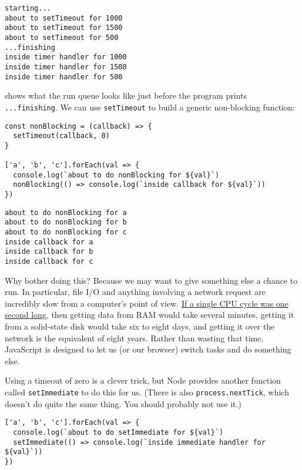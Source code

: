 \begin{verbatim}
starting...
about to setTimeout for 1000
about to setTimeout for 1500
about to setTimeout for 500
...finishing
inside timer handler for 1000
inside timer handler for 1500
inside timer handler for 500
\end{verbatim}


 shows what the run queue looks like just before the program prints \texttt{...finishing}.
We can use \texttt{setTimeout} to build a generic non-blocking function:

\begin{verbatim}
const nonBlocking = (callback) => {
  setTimeout(callback, 0)
}

['a', 'b', 'c'].forEach(val => {
  console.log(`about to do nonBlocking for ${val}`)
  nonBlocking(() => console.log(`inside callback for ${val}`))
})
\end{verbatim}

\begin{verbatim}
about to do nonBlocking for a
about to do nonBlocking for b
about to do nonBlocking for c
inside callback for a
inside callback for b
inside callback for c
\end{verbatim}

Why bother doing this?
Because we may want to give something else a chance to run.
In particular,
file I/O and anything involving a network request are incredibly slow from a computer's point of view.
\href{http://exple.tive.org/blarg/2018/08/15/time-dilation/}{If a single CPU cycle was one second long},
then getting data from RAM would take several minutes,
getting it from a solid-state disk would take six to eight days,
and getting it over the network is the equivalent of eight years.
Rather than wasting that time,
JavaScript is designed to let us (or our browser) switch tasks and do something else.

Using a timeout of zero is a clever trick,
but Node provides another function called \texttt{setImmediate} to do this for us.
(There is also \texttt{process.nextTick},
which doesn't do quite the same thing.
You should probably not use it.)

\begin{verbatim}
['a', 'b', 'c'].forEach(val => {
  console.log(`about to do setImmediate for ${val}`)
  setImmediate(() => console.log(`inside immediate handler for ${val}`))
})
\end{verbatim}

